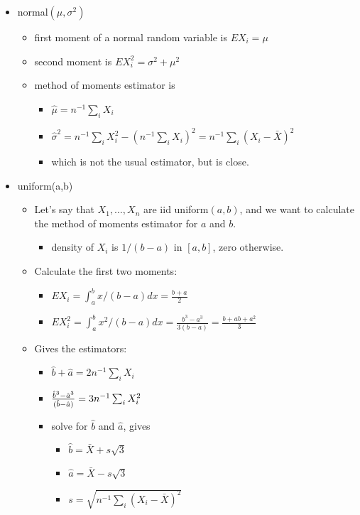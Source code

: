 \begin{itemize}
\item normal$(\mu,\sigma^2)$
\begin{itemize}
\item first moment of a normal random variable is $E X_i = \mu$
\item second moment is $E X_i^2 = \sigma^2 + \mu^2$
\item method of moments estimator is
\begin{itemize}
\item $\hat \mu = n^{-1} \sum_i X_i$
\item $\hat \sigma^2 = n^{-1} \sum_i X_i^2 - (n^{-1}\sum_i X_i)^2
           = n^{-1} \sum_i(X_i - \bar X)^2$
\item which is not the usual estimator, but is close.
\end{itemize}
\end{itemize}
\item uniform(a,b)
\begin{itemize}
\item Let's say that $X_1,\dots,X_n$ are iid uniform$(a,b)$, and we want
         to calculate the method of moments estimator for $a$ and $b$.
\begin{itemize}
\item density of $X_i$ is $1/(b-a)$ in $[a,b]$, zero otherwise.
\end{itemize}
\item Calculate the first two moments:
\begin{itemize}
\item $E X_i = \int_a^b x /(b-a) dx = \frac{b+a}{2}$
\item $E X_i^2 = \int_a^b x^2 /(b-a) dx = \frac{b^3 - a^3}{3(b - a)} = \frac{b + ab + a^2}{3}$
\end{itemize}
\item Gives the estimators:
\begin{itemize}
\item $\hat b+\hat a = 2 n^{-1} \sum_i X_i$
\item ${\hat b^3-\hat a^3 \over (\hat b- \hat a)} = 3 n^{-1} \sum_i X_i^2$
\item solve for $\hat b$ and $\hat a$, gives
\begin{itemize}
\item $\hat b = \bar X + s \sqrt{3}$
\item $\hat a = \bar X - s \sqrt{3}$
\item $s = \sqrt{n^{-1} \sum_i (X_i - \bar X)^2}$
\end{itemize}

\end{itemize}
\end{itemize}
\end{itemize}
